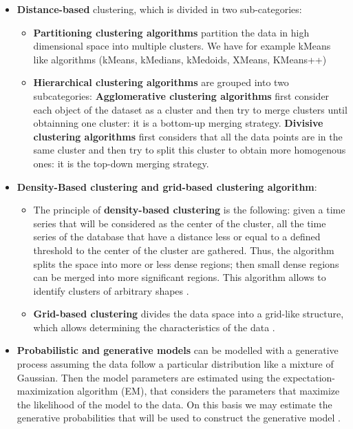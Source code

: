 \begin{itemize}
\item   \textbf{Distance-based} clustering, which is divided in two sub-categories:
	\begin{itemize}
	\item \textbf{Partitioning clustering algorithms}  partition the data in        	high dimensional space into multiple clusters. We have for example kMeans like 		algorithms (kMeans, kMedians, kMedoids, XMeans, KMeans++)
	\item \textbf{Hierarchical clustering algorithms} are grouped into two 				subcategories: \textbf{Agglomerative clustering algorithms} first consider each 		object of the dataset as a cluster and then try to merge clusters until  obtainning 		one cluster: it is a bottom-up merging strategy. \textbf{Divisive clustering 			algorithms} first considers that all the data points are in the same cluster 		and then try to split this cluster to obtain more homogenous ones: it is the top-down merging strategy.
	\end{itemize}
   
\item \textbf{Density-Based clustering and grid-based clustering algorithm}:
 
\begin{itemize}
	\item The principle of \textbf{density-based clustering} is the following:   given a time 		series that will be considered as the center of the cluster,  all the time series of the database that have a distance less or 		equal to a defined threshold to the center of the cluster are gathered. Thus, the 			algorithm splits the space into more or less dense regions; then small dense  			regions can be merged into more significant regions. This algorithm allows to identify  		clusters of arbitrary shapes  \cite{kriegel2011density, kharrat2008clustering}.
	\item \textbf{Grid-based clustering} divides the data space into a grid-like 				structure, which allows determining the characteristics of the data \cite{amini2011study}.
\end{itemize}


\item \textbf{Probabilistic and generative models} can be modelled  with a generative process assuming the data follow a particular distribution like a mixture of Gaussian. Then the model parameters are estimated using the expectation-maximization algorithm (EM), that considers the parameters that maximize the likelihood of the model to the data. On this basis we may estimate the generative probabilities that will be used to construct the generative model \cite{merugu2003privacy}.



\end{itemize}
